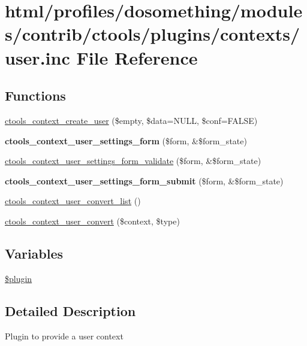 \hypertarget{user_8inc}{
\section{html/profiles/dosomething/modules/contrib/ctools/plugins/contexts/user.inc File Reference}
\label{user_8inc}
}
\subsection*{Functions}
\begin{DoxyCompactItemize}
\item 
\hyperlink{user_8inc_a0abeb33ef10a6010f433559307dd2e48}{ctools\_\-context\_\-create\_\-user} (\$empty, \$data=NULL, \$conf=FALSE)
\item 
\hypertarget{user_8inc_a064b35c954a24bcc97bf00855d024dc6}{
{\bfseries ctools\_\-context\_\-user\_\-settings\_\-form} (\$form, \&\$form\_\-state)}
\label{user_8inc_a064b35c954a24bcc97bf00855d024dc6}

\item 
\hyperlink{user_8inc_a6388a4541075fe441b3da787df5c07ba}{ctools\_\-context\_\-user\_\-settings\_\-form\_\-validate} (\$form, \&\$form\_\-state)
\item 
\hypertarget{user_8inc_ae46a2e2c4d70726bc6b430dafe04b9d3}{
{\bfseries ctools\_\-context\_\-user\_\-settings\_\-form\_\-submit} (\$form, \&\$form\_\-state)}
\label{user_8inc_ae46a2e2c4d70726bc6b430dafe04b9d3}

\item 
\hyperlink{user_8inc_a876ddbeabf0ebae4a9af6144c336492a}{ctools\_\-context\_\-user\_\-convert\_\-list} ()
\item 
\hyperlink{user_8inc_a818b09f1b7037df77bf28e1748dfcdcb}{ctools\_\-context\_\-user\_\-convert} (\$context, \$type)
\end{DoxyCompactItemize}
\subsection*{Variables}
\begin{DoxyCompactItemize}
\item 
\hyperlink{user_8inc_ada8a7130088351710bb02ed622d6bf65}{\$plugin}
\end{DoxyCompactItemize}


\subsection{Detailed Description}
Plugin to provide a user context 

